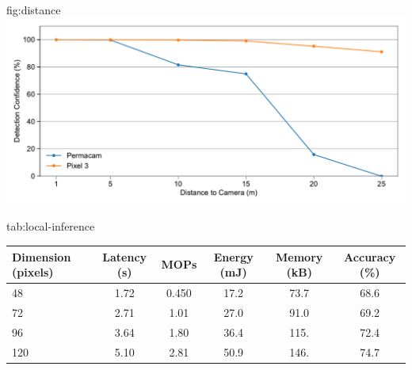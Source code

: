 \begin{definefigure}{fig:distance}
    \centering
    \includegraphics[width=\columnwidth]{figs/permacam/permacam_processing/distance_detection.pdf}
    \caption{
        Detection confidence as distance from camera to person is increased. Compared to a modern smartphone camera, the camera on \namec cannot compete due to limited resolution. However, images captured by \namec still enable person detection at a distance of 15-20 meters. This distance is generally sufficient for most indoor spaces.
    }
\end{definefigure}

\begin{definetable}{tab:local-inference}
\begin{tabularx}{\columnwidth}{l c c c c c}
Dimension (pixels) & Latency (s) & MOPs & Energy (mJ) & Memory (kB) & Accuracy (\%) \\
\hline
48 & 1.72 & 0.450 & 17.2 & 73.7 & 68.6 \\
72 & 2.71 & 1.01 & 27.0 & 91.0 & 69.2 \\
96 & 3.64 & 1.80 & 36.4 & 115. & 72.4 \\
120 & 5.10 & 2.81 & 50.9 & 146. & 74.7 \\
\end{tabularx}
\caption {
    Latency, millions of operations, energy, peak memory, and accuracy 
    of local person classification. Images must be downscaled from full resolution, as inference on a 320x320 image requires too much runtime memory. The quantized version of model weights are used to measure accuracy of the validation set. The highest accuracy achieved is only 74.7\%, and requires 5.1 seconds of continuous computation.
}
\end{definetable}


